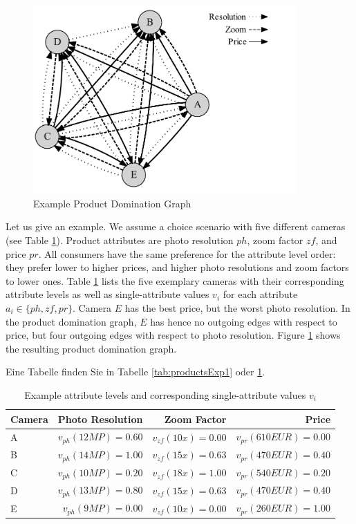 \begin{figure}[t]
  	\caption{Example Product Domination Graph}\label{fig:productGraph}
  	\begin{center}
 		\includegraphics[width=10cm]{graphics/ProductDominationGraph}
 	\end{center}
\end{figure}

Let us give an example. We assume a choice scenario with five different cameras (see Table \ref{tab:cameras}). Product attributes are photo resolution $ph$, zoom factor $zf$, and price $pr$. All consumers have the same preference for the attribute level order: they prefer lower to higher prices, and higher photo resolutions and zoom factors to lower ones. Table \ref{tab:cameras} lists the five exemplary cameras with their corresponding attribute levels as well as single-attribute values $v_{i}$ for each attribute $a_i\in\{ph, zf, pr\}$.
Camera $E$ has the best price, but the worst photo resolution. In the product domination graph, $E$ has hence no outgoing edges with respect to price, but four outgoing edges with respect to photo resolution. Figure \ref{fig:productGraph} shows the resulting product domination graph.

Eine Tabelle finden Sie in Tabelle  \ref{tab:productsExp1} oder \ref{tab:cameras}.
\begin{table}%
	\caption{Example attribute levels and corresponding single-attribute values $v_i$}\label{tab:cameras}
	\begin{center}\small
		\begin{tabular}{lrrr}  		
			\hline
			Camera & Photo Resolution & Zoom Factor & Price\\
			\hline
			A & $v_{ph}(12 MP) = 0.60$ & $v_{zf}(10x) = 0.00$ & $v_{pr}(610 EUR) = 0.00$\\
			B & $v_{ph}(14 MP) = 1.00$ & $v_{zf}(15x) = 0.63$ & $v_{pr}(470 EUR) = 0.40$\\
			C & $v_{ph}(10 MP) = 0.20$ & $v_{zf}(18x) = 1.00$ & $v_{pr}(540 EUR) = 0.20$\\
			D & $v_{ph}(13 MP) = 0.80$ & $v_{zf}(15x) = 0.63$ & $v_{pr}(470 EUR) = 0.40$\\
			E & $v_{ph}(9 MP) = 0.00$ & $v_{zf}(10x) = 0.00$ & $v_{pr}(260 EUR) = 1.00$\\
			\hline
		\end{tabular}
	\end{center}
\end{table} 	


